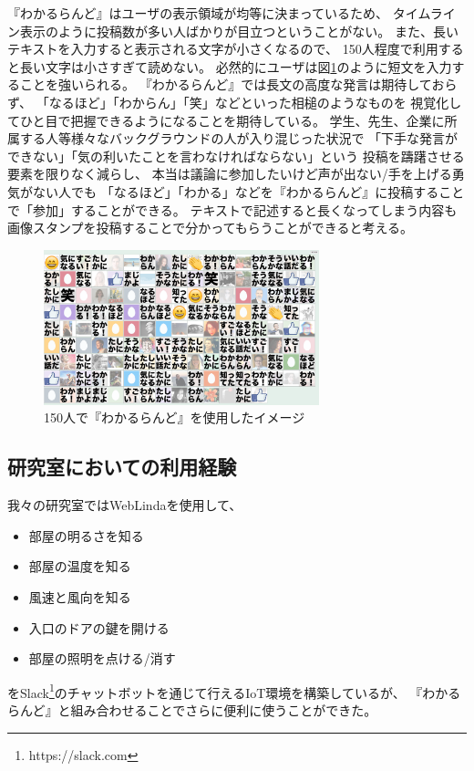 『わかるらんど』はユーザの表示領域が均等に決まっているため、
タイムライン表示のように投稿数が多い人ばかりが目立つということがない。
また、長いテキストを入力すると表示される文字が小さくなるので、
150人程度で利用すると長い文字は小さすぎて読めない。
必然的にユーザは図\ref{wakaruland150}のように短文を入力することを強いられる。
『わかるらんど』では長文の高度な発言は期待しておらず、
「なるほど」「わからん」「笑」などといった相槌のようなものを
視覚化してひと目で把握できるようになることを期待している。
学生、先生、企業に所属する人等様々なバックグラウンドの人が入り混じった状況で
「下手な発言ができない」「気の利いたことを言わなければならない」という
投稿を躊躇させる要素を限りなく減らし、
本当は議論に参加したいけど声が出ない/手を上げる勇気がない人でも
「なるほど」「わかる」などを『わかるらんど』に投稿することで「参加」することができる。
テキストで記述すると長くなってしまう内容も
画像スタンプを投稿することで分かってもらうことができると考える。


\begin{figure}[h]
\centering
\includegraphics[width=8cm]{images/wakaruland150.png}
\caption{150人で『わかるらんど』を使用したイメージ}
\label{wakaruland150}
\end{figure}

\subsection{研究室においての利用経験}
我々の研究室ではWebLindaを使用して、
\begin{itemize}
\item 部屋の明るさを知る
\item 部屋の温度を知る
\item 風速と風向を知る
\item 入口のドアの鍵を開ける
\item 部屋の照明を点ける/消す
\end{itemize}
をSlack\footnote{https://slack.com}のチャットボットを通じて行えるIoT環境を構築しているが、
『わかるらんど』と組み合わせることでさらに便利に使うことができた。

